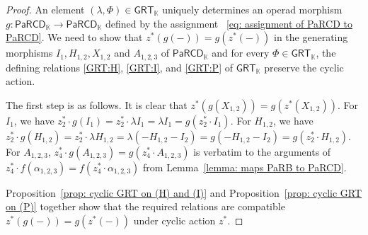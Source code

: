 \documentclass{amsart}
\newcommand{\kk}{\mathbb{K}}    %
\newcommand{\PaRCD}{\mathsf{PaRCD}}
\newcommand{\hPaRCD}{{\PaRCD}_{\kk}}
\newcommand{\GRT}{{\mathsf{GRT}}}
\theoremstyle{definition}
\numberwithin{equation}{section}
\begin{document}
\begin{proof}
An element $(\lambda, \Phi) \in \GRT_{\kk}$ uniquely determines an operad morphism $g:\PaRCD_{\kk} \rightarrow \hPaRCD$ defined by the assignment ~\eqref{eq: assignment of PaRCD to PaRCD}. We need to show that $z^*(g(-)) = g(z^*(-))$ in the generating morphisms $I_{1}, H_{1,2}, X_{1,2}$ and $A_{1,2,3}$ of $\PaRCD_{\kk}$ and for every $\Phi \in \GRT_{\kk}$, the defining relations \eqref{GRT:H}, \eqref{GRT:I}, and \eqref{GRT:P} of $\GRT_{\kk}$ preserve the cyclic action.  

The first step is as follows. It is clear that $z^*(g(X_{1,2})) = g(z^*(X_{1,2}))$. For $I_1$, we have $z_2^* \cdot g(I_{1}) = z_2^* \cdot \lambda I_{1} = \lambda I_{1} = g(z_2^* \cdot I_{1})$. For $H_{1,2}$, we have $z_2^* \cdot g(H_{1,2}) = z_2^* \cdot \lambda H_{1,2} =  \lambda (-H_{1,2}-I_2) =  g(-H_{1,2} -I_{2}) = g(z_2^* \cdot H_{1,2})$. For $A_{1,2,3}$, $z_4^* \cdot g(A_{1,2,3}) =  g(z_4^* \cdot A_{1,2,3})$ is verbatim to the arguments of $z_4^* \cdot f(\alpha_{1,2,3}) =  f(z_4^* \cdot \alpha_{1,2,3})$ from Lemma~\ref{lemma: maps PaRB to PaRCD}.

Proposition~\ref{prop: cyclic GRT on (H) and (I)} and Proposition~\ref{prop: cyclic GRT on (P)} together show that the required relations are compatible $z^*(g(-)) = g(z^*(-))$ under cyclic action $z^*$. 

\end{proof}
\end{document}
